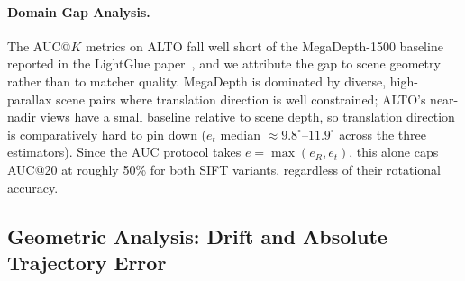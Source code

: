 \documentclass[11pt,a4paper]{article}
\begin{document}
\begin{table}[H]
\centering
{}
\caption{Relative Pose Error and AUC@$K$ (test split, gap\,=\,5).}
\label{tab:pose}
\end{table}

\paragraph{Domain Gap Analysis.}
The AUC@$K$ metrics on ALTO fall well short of the MegaDepth-1500
baseline reported in the LightGlue paper~\cite{lightglue}, and we
attribute the gap to scene geometry rather than to matcher quality.
MegaDepth is dominated by diverse, high-parallax scene pairs where
translation direction is well constrained; ALTO's near-nadir views
have a small baseline relative to scene depth, so translation
direction is comparatively hard to pin down ($e_t$ median
$\approx 9.8^\circ$--$11.9^\circ$ across the three estimators). Since
the AUC protocol takes $e = \max(e_R, e_t)$, this alone caps AUC@20 at
roughly 50\% for both SIFT variants, regardless of their rotational
accuracy.

\subsection{Geometric Analysis: Drift and Absolute Trajectory Error}

\begin{table}[H]
\centering
{}
\caption{ATE over a 12.0\,m ground-truth test-split segment (gap\,=\,5).}
\label{tab:ate}
\end{table}
\end{document}
